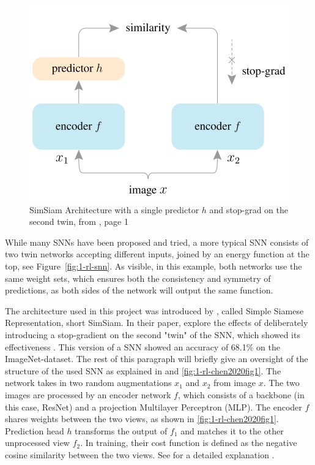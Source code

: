 \documentclass[sigconf, natbib=false, nonacm]{acmart}
\begin{document}
        \begin{figure}
            \includegraphics[width=\linewidth]{figures/1-rl-chen2020fig1.png}
            \caption{SimSiam Architecture with a single predictor $h$ and stop-grad on the second twin, from \citeauthor{Chen2020a} \cite{Chen2020a}, page 1}
            \label{fig:1-rl-chen2020fig1}
        \end{figure}
        
        While many SNNs have been proposed and tried, a more typical SNN consists of two twin networks accepting different inputs, joined by an energy function at the top, see Figure~\ref{fig:1-rl-snn}. As visible, in this example, both networks use the same weight sets, which ensures both the consistency and symmetry of predictions, as both sides of the network will output the same function. 
        
        The architecture used in this project was introduced by \citeauthor{Chen2020a}, called Simple Siamese Representation, short SimSiam. In their paper, \citeauthor{Chen2020a} explore the effects of deliberately introducing a stop-gradient on the second "twin" of the SNN, which showed its effectiveness \cite{Chen2020a}. This version of a SNN showed an accuracy of 68.1\% on the ImageNet-dataset. The rest of this paragraph will briefly give an oversight of the structure of the used SNN as explained in \cite{Chen2020a} and \autoref{fig:1-rl-chen2020fig1}. The network takes in two random augmentations $x_1$ and $x_2$ from image $x$. The two images are processed by an encoder network $f$, which consists of a backbone (in this case, ResNet) and a projection Multilayer Perceptron (MLP). The encoder $f$ shares weights between the two views, as shown in \autoref{fig:1-rl-chen2020fig1}. Prediction head $h$ transforms the output of $f_1$ and matches it to the other unprocessed view $f_2$. In training, their cost function is defined as the negative cosine similarity between the two views. See for a detailed explanation \cite{Chen2020a}.   
    
\end{document}
